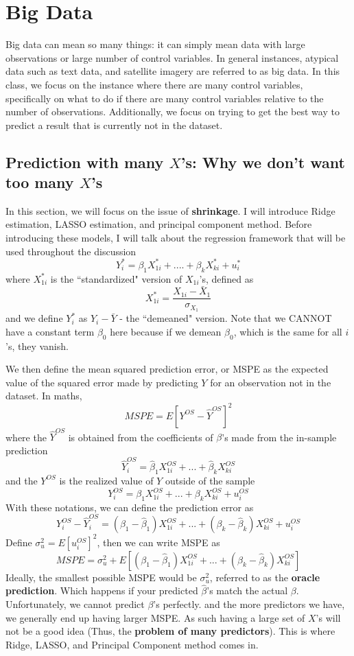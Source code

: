 \documentclass[12pt]{article}
\theoremstyle{definition}
\theoremstyle{property}
\theoremstyle{assumption}
\theoremstyle{example}
\theoremstyle{comment}
\begin{document}
\section{Big Data}
Big data can mean so many things: it can simply mean data with large observations or large number of control variables. In general instances, atypical data such as text data, and satellite imagery are referred to as big data. In this class, we focus on the instance where there are many control variables, specifically on what to do if there are many control variables relative to the number of observations. Additionally, we focus on trying to get the best way to predict a result that is currently not in the dataset.
\par\medskip 
\subsection{Prediction with many $X$'s: Why we don't want too many $X$'s}
In this section, we will focus on the issue of \textbf{shrinkage}. I will introduce Ridge estimation, LASSO estimation, and principal component method. Before introducing these models, I will talk about the regression framework that will be used throughout the discussion
\[
Y_{i}^*=\beta_1X_{1i}^*+....+\beta_kX_{ki}^*+u_i^*
\]
where $X_{1i}^*$ is the ``standardized" version of $X_{1i}$'s, defined as
\[
X_{1i}^*=\frac{X_{1i}-\bar{X}_1}{\sigma_{X_{1}}}
\]
and we define $Y^*_i$ as $Y_{i}-\bar{Y}$ - the ``demeaned" version. Note that we CANNOT have a constant term $\beta_0$ here because if we demean $\beta_0$, which is the same for all $i$'s, they vanish. 
\par\medskip
We then define the mean squared prediction error, or MSPE as the expected value of the squared error made by predicting $Y$ for an observation not in the dataset. In maths, 
\[
MSPE= E[Y^{OS}-\hat{Y}^{OS}]^2
\]
where the $\hat{Y}^{OS}$ is obtained from the coefficients of $\beta$'s made from the in-sample prediction
\[
\hat{Y}_i^{OS}=\hat{\beta}_1X_{1i}^{OS}+ ... +\hat{\beta}_kX_{ki}^{OS}
\]
and the $Y^{OS}$ is the realized value of $Y$ outside of the sample
\[
Y_i^{OS}=\beta_1X_{1i}^{OS}+ ... +\beta_kX_{ki}^{OS}+u_i^{OS}
\]
With these notations, we can define the prediction error as
\[
Y_i^{OS}-\hat{Y}_i^{OS}=(\beta_1-\hat{\beta}_1)X^{OS}_{1i}+...+(\beta_k-\hat{\beta}_k)X^{OS}_{ki}+u_i^{OS}
\]
Define $\sigma_u^2=E[u_i^{OS}]^2$, then we can write MSPE as
\[
MSPE=\sigma_u^2+ E[(\beta_1-\hat{\beta}_1)X^{OS}_{1i}+...+(\beta_k-\hat{\beta}_k)X^{OS}_{ki}]
\]
Ideally, the smallest possible MSPE would be $\sigma_u^2$, referred to as the \textbf{oracle prediction}. Which happens if your predicted $\hat{\beta}$'s match the actual $\beta$. Unfortunately, we cannot predict $\beta$'s perfectly. and the more predictors we have, we generally end up having larger MSPE. As such having a large set of $X$'s will not be a good idea (Thus, the \textbf{problem of many predictors}). This is where Ridge, LASSO, and Principal Component method comes in.
\end{document}
